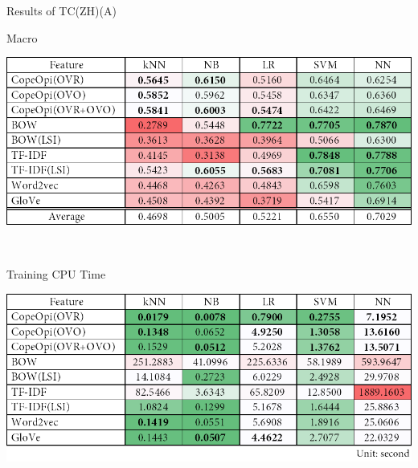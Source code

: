 \begin{table}[H]
\caption{Results of TC(ZH)(A)}
\label{tab:tc_zh_a}
\centering
\begin{subtable}{\textwidth}
	\centering
	\caption{Macro \fscore{}}
	\includegraphics[width=\resultfigwidth]{chapters/ch4/table/tc/TC(ZH)(A).png}
\end{subtable}
\\[\tblskip]
\begin{subtable}{\textwidth}
	\centering
	\caption{Training CPU Time}
	\includegraphics[width=\resultfigwidth]{chapters/ch4/table/tc/TC(ZH)(A)T.png}
\end{subtable}
\end{table}